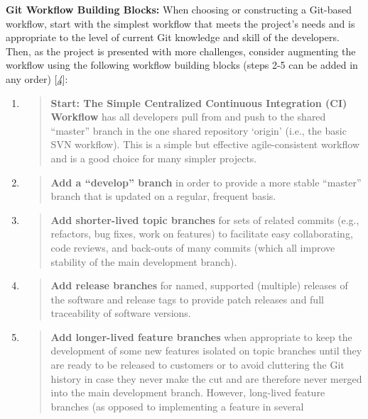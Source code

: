 \documentclass[]{article}
\begin{document}
\textbf{Git Workflow Building Blocks:} When choosing or constructing a
Git-based workflow, start with the simplest workflow that meets the
project's needs and is appropriate to the level of current Git knowledge
and skill of the developers. Then, as the project is presented with more
challenges, consider augmenting the workflow using the following
workflow building blocks (steps 2-5 can be added in any order)
{[}\protect\hyperlink{id.bol9ubml03th}{\emph{4}}{]}:

\begin{enumerate}
\def\labelenumi{\arabic{enumi}.}
\item
  \begin{quote}
  \textbf{Start: The Simple Centralized Continuous Integration (CI)
  Workflow} has all developers pull from and push to the shared
  ``master'' branch in the one shared repository `origin' (i.e., the
  basic SVN workflow). This is a simple but effective agile-consistent
  workflow and is a good choice for many simpler projects.
  \end{quote}
\item
  \begin{quote}
  \textbf{Add a ``develop'' branch} in order to provide a more stable
  ``master'' branch that is updated on a regular, frequent basis.
  \end{quote}
\item
  \begin{quote}
  \textbf{Add shorter-lived topic branches} for sets of related commits
  (e.g., refactors, bug fixes, work on features) to facilitate easy
  collaborating, code reviews, and back-outs of many commits (which all
  improve stability of the main development branch).
  \end{quote}
\item
  \begin{quote}
  \textbf{Add release branches} for named, supported (multiple) releases
  of the software and release tags to provide patch releases and full
  traceability of software versions.
  \end{quote}
\item
  \begin{quote}
  \textbf{Add longer-lived feature branches} when appropriate to keep
  the development of some new features isolated on topic branches until
  they are ready to be released to customers or to avoid cluttering the
  Git history in case they never make the cut and are therefore never
  merged into the main development branch. However, long-lived feature
  branches (as opposed to implementing a feature in several

\end{quote}
\end{enumerate}
\end{document}
